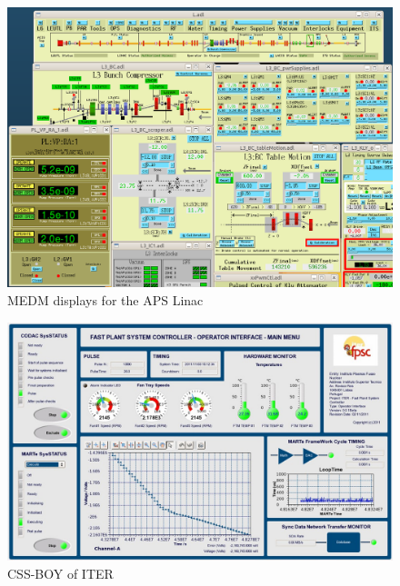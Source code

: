 \begin{figure}[h!]
\begin{center}
\includegraphics[width=5.5in]{figures/aps_linac.png}
\caption{MEDM displays for the APS Linac \label{aps-linac}}
\end{center}
\end{figure}

\begin{figure}[h!]
\begin{center}
\includegraphics[width=5.5in]{figures/css-boy-iter.png}
\caption{CSS-BOY of ITER \label{css-boy-iter}}
\end{center}
\end{figure}



